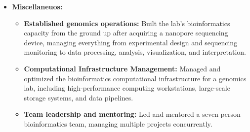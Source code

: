 \documentclass[11pt,a4paper,sans]{moderncv}
\begin{document}
{\begin{itemize}
    \item \textbf{Miscellaneuos:}
    \begin{itemize}
      \item \textbf{Established genomics operations:} {\footnotesize Built the lab's bioinformatics capacity from the ground up after acquiring a nanopore sequencing device, managing everything from experimental design and sequencing monitoring to data processing, analysis, visualization, and interpretation.}
      \item \textbf{Computational Infrastructure Management:} {\footnotesize Managed and optimized the bioinformatics computational infrastructure for a genomics lab, including high-performance computing workstations, large-scale storage systems, and data pipelines.}
      \item \textbf{Team leadership and mentoring:} {\footnotesize Led and mentored a seven-person bioinformatics team, managing multiple projects concurrently.}
      \end{itemize}
  \end{itemize}
  }

\end{document}

